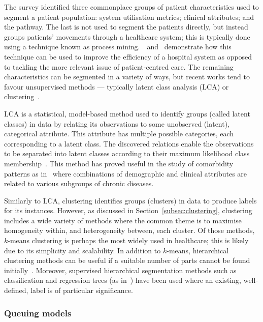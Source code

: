 The survey identified three commonplace groups of patient characteristics used
to segment a patient population: system utilisation metrics; clinical
attributes; and the pathway. The last is not used to segment the patients
directly, but instead groups patients' movements through a healthcare system;
this is typically done using a technique known as process
mining.~\cite{Arnolds2018}~and~\cite{Delias2015} demonstrate how this technique
can be used to improve the efficiency of a hospital system as opposed to
tackling the more relevant issue of patient-centred care. The remaining
characteristics can be segmented in a variety of ways, but recent works tend to
favour unsupervised methods --- typically latent class analysis (LCA) or
clustering~\cite{Yan2018}.

LCA is a statistical, model-based method used to identify groups (called latent
classes) in data by relating its observations to some unobserved (latent),
categorical attribute. This attribute has multiple possible categories, each
corresponding to a latent class. The discovered relations enable the
observations to be separated into latent classes according to their maximum
likelihood class membership~\cite{Hagenaars2002,Lazarsfeld1968}. This method has
proved useful in the study of comorbidity patterns as
in~\cite{Kuwornu2014,Larsen2017} where combinations of demographic and clinical
attributes are related to various subgroups of chronic diseases.

Similarly to LCA, clustering identifies groups (clusters) in data to produce
labels for its instances. However, as discussed in
Section~\ref{subsec:clustering}, clustering includes a wide variety of methods
where the common theme is to maximise homogeneity within, and heterogeneity
between, each cluster. Of those methods, \(k\)-means clustering is perhaps the
most widely used in healthcare; this is likely due to its simplicity and
scalability. In addition to \(k\)-means, hierarchical clustering methods can be
useful if a suitable number of parts cannot be found initially~\cite{Vuik2016a}.
Moreover, supervised hierarchical segmentation methods such as classification
and regression trees (as in~\cite{Harper2006}) have been used where an existing,
well-defined, label is of particular significance.

\subsubsection{Queuing models}

